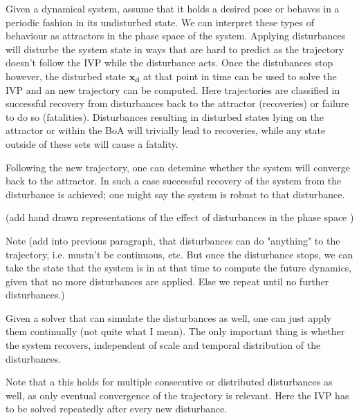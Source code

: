     Given a dynamical system, assume that it holds a desired pose or behaves in a periodic fashion in its undisturbed state. We can interpret these types of behaviour as attractors in the phase space of the system. Applying disturbances will disturbe the system state in ways that are hard to predict as the trajectory doesn't follow the IVP while the disturbance acts. Once the distubances stop however, the disturbed state $\mathbf{x_d}$ at that point in time can be used to solve the IVP and an new trajectory can be computed. Here trajectories are classified in successful recovery from disturbances back to the attractor (recoveries) or failure to do so (fatalities). Disturbances resulting in disturbed states lying on the attractor or within the BoA will trivially lead to recoveries, while any state outside of these sets will cause a fatality. 

     Following the new trajectory, one can detemine whether the system will converge back to the attractor. In such a case successful recovery of the system from the disturbance is achieved; one might say the system is robust to that disturbance. %

    (add hand drawn representations of the effect of disturbances in the phase space )

    Note (add into previous paragraph, that disturbances can do "anything" to the trajectory, i.e. mustn't be continuous, etc. But once the disturbance stops, we can take the state that the system is in at that time to compute the future dynamics, given that no more disturbances are applied. Else we repeat until no further disturbances.)

    Given a solver that can simulate the disturbances as well, one can just apply them continually (not quite what I mean). The only important thing is whether the system recovers, independent of scale and temporal distribution of the disturbances. 





    Note that a this holds for multiple consecutive or distributed disturbances as well, as only eventual convergence of the trajectory is relevant. Here the IVP has to be solved repeatedly after every new disturbance. %

